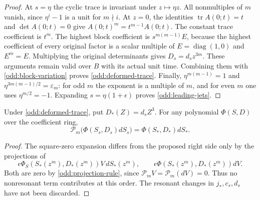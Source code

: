 \begin{proof}
At $s=\eta$ the cyclic trace is invariant under $z\mapsto\eta z$.
All nonmultiples of $m$ vanish, since $\eta^i-1$ is a unit for
$m\nmid i$. At $z=0$, the identities
$\operatorname{tr}A(0;t)=t$ and $\det A(0;t)=0$ give
$A(0;t)^m=t^{m-1}A(0;t)$. The constant trace coefficient is $t^m$.
The highest block coefficient is $s^{m(m-1)}E$, because the
highest coefficient of every original factor is a scalar multiple
of $E=\operatorname{diag}(1,0)$ and $E^m=E$. Multiplying the original
determinants gives $D_s=d_s z^{3m}$. These arguments remain valid
over $B$ with its actual unit time. Combining them with
\eqref{odd:block-variation} proves \eqref{odd:deformed-trace}.
Finally, $\eta^{m(m-1)}=1$ and
$\eta^{3m(m-1)/2}=\varepsilon_m$: for odd $m$ the exponent is a
multiple of $m$, and for even $m$ one uses $\eta^{m/2}=-1$.
Expanding $s=\eta(1+\epsilon)$ proves
\eqref{odd:leading-jets}.
\end{proof}

\begin{lemma}
\label{odd:projection}
Under \eqref{odd:deformed-trace}, put $D_*(Z)=d_sZ^3$.
For any polynomial $\Phi(S,D)$ over the coefficient ring,
\begin{equation}
 \mathcal P_m\bigl(\Phi(S_s,D_s)dS_s\bigr)
 =\Phi(S_*,D_*)dS_*.
 \label{odd:projection-equation}
\end{equation}
\end{lemma}

\begin{proof}
The square-zero expansion differs from the proposed right side
only by the projections of
\[
 \epsilon\Phi_S(S_*(z^m),D_*(z^m))V\,dS_*(z^m),
 \qquad
 \epsilon\Phi(S_*(z^m),D_*(z^m))dV.
\]
Both are zero by \eqref{odd:projection-rule}, since
$\mathcal P_mV=\mathcal P_m(dV)=0$. Thus no nonresonant term
contributes at this order. The resonant changes in $j_*,c_s,d_s$
have not been discarded.
\end{proof}

